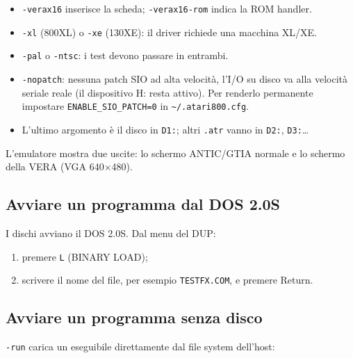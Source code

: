 \documentclass[
]{article}
\newenvironment{Shaded}{}{}
\newcommand{\AttributeTok}[1]{\textcolor[rgb]{0.49,0.56,0.16}{#1}}
\newcommand{\DataTypeTok}[1]{\textcolor[rgb]{0.56,0.13,0.00}{#1}}
\newcommand{\NormalTok}[1]{#1}
\newcommand{\VariableTok}[1]{\textcolor[rgb]{0.10,0.09,0.49}{#1}}
\providecommand{\tightlist}{%
  \setlength{\itemsep}{0pt}\setlength{\parskip}{0pt}}
\begin{document}
\begin{itemize}
\tightlist
\item
  \texttt{-verax16} inserisce la scheda; \texttt{-verax16-rom} indica la
  ROM handler.
\item
  \texttt{-xl} (800XL) o \texttt{-xe} (130XE): il driver richiede una
  macchina XL/XE.
\item
  \texttt{-pal} o \texttt{-ntsc}: i test devono passare in entrambi.
\item
  \texttt{-nopatch}: nessuna patch SIO ad alta velocità, l'I/O su disco
  va alla velocità seriale reale (il dispositivo H: resta attivo). Per
  renderlo permanente impostare \texttt{ENABLE\_SIO\_PATCH=0} in
  \texttt{\textasciitilde{}/.atari800.cfg}.
\item
  L'ultimo argomento è il disco in \texttt{D1:}; altri \texttt{.atr}
  vanno in \texttt{D2:}, \texttt{D3:}\ldots{}
\end{itemize}

L'emulatore mostra due uscite: lo schermo ANTIC/GTIA normale e lo
schermo della VERA (VGA 640×480).

\subsection{Avviare un programma dal DOS
2.0S}\label{avviare-un-programma-dal-dos-2.0s}

I dischi avviano il DOS 2.0S. Dal menu del DUP:

\begin{enumerate}
\def\labelenumi{\arabic{enumi}.}
\tightlist
\item
  premere \texttt{L} (BINARY LOAD);
\item
  scrivere il nome del file, per esempio \texttt{TESTFX.COM}, e premere
  Return.
\end{enumerate}

\subsection{Avviare un programma senza
disco}\label{avviare-un-programma-senza-disco}

\texttt{-run} carica un eseguibile direttamente dal file system
dell'host:

\begin{Shaded}
\end{Shaded}
\end{document}
